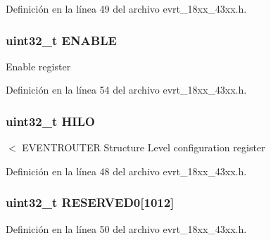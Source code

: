 Definición en la línea 49 del archivo evrt\+\_\+18xx\+\_\+43xx.\+h.

\subsubsection[{\texorpdfstring{E\+N\+A\+B\+LE}{ENABLE}}]{ uint32\+\_\+t E\+N\+A\+B\+LE}\hypertarget{struct_l_p_c___e_v_r_t___t_a92c23e9b88593bf89218d85da0c67585}{}\label{struct_l_p_c___e_v_r_t___t_a92c23e9b88593bf89218d85da0c67585}
Enable register 

Definición en la línea 54 del archivo evrt\+\_\+18xx\+\_\+43xx.\+h.

\subsubsection[{\texorpdfstring{H\+I\+LO}{HILO}}]{ uint32\+\_\+t H\+I\+LO}\hypertarget{struct_l_p_c___e_v_r_t___t_aa0242aa69e2f2c5462e40d159ceec6aa}{}\label{struct_l_p_c___e_v_r_t___t_aa0242aa69e2f2c5462e40d159ceec6aa}
$<$ E\+V\+E\+N\+T\+R\+O\+U\+T\+ER Structure Level configuration register 

Definición en la línea 48 del archivo evrt\+\_\+18xx\+\_\+43xx.\+h.

\subsubsection[{\texorpdfstring{R\+E\+S\+E\+R\+V\+E\+D0}{RESERVED0}}]{ uint32\+\_\+t R\+E\+S\+E\+R\+V\+E\+D0\mbox{[}1012\mbox{]}}\hypertarget{struct_l_p_c___e_v_r_t___t_aa30fe60f09b5291251c6166bca12b9aa}{}\label{struct_l_p_c___e_v_r_t___t_aa30fe60f09b5291251c6166bca12b9aa}


Definición en la línea 50 del archivo evrt\+\_\+18xx\+\_\+43xx.\+h.

